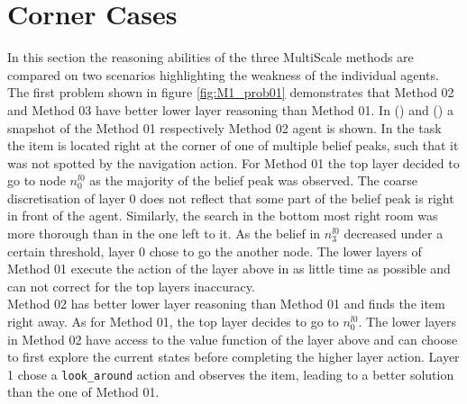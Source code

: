 
\section{Corner Cases}\label{sec:cornercases}
In this section the reasoning abilities of the three MultiScale methods are compared on two scenarios highlighting the weakness of the individual agents. The first problem shown in figure \ref{fig:M1_prob01} demonstrates that Method 02 and Method 03 have better lower layer reasoning than Method 01. In () and () a snapshot of the Method 01 respectively Method 02 agent is shown. In the task the item is located right at the corner of one of multiple belief peaks, such that it was not spotted by the navigation action. For Method 01 the top layer decided to go to node $n_0^{l0}$ as the majority of the belief peak was observed. The coarse discretisation of layer 0 does not reflect that some part of the belief peak is right in front of the agent. Similarly, the search in the bottom most right room was more thorough than in the one left to it. As the belief in $n_3^{l0}$ decreased under a certain threshold, layer 0 chose to go the another node. The lower layers of Method 01 execute the action of the layer above in as little time as possible and can not correct for the top layers inaccuracy. \\
Method 02 has better lower layer reasoning than Method 01 and finds the item right away. As for Method 01, the top layer decides to go to $n_0^{l0}$. The lower layers in Method 02 have access to the value function of the layer above and can choose to first explore the current states before completing the higher layer action. Layer 1 chose a \texttt{look\_around} action and observes the item, leading to a better solution than the one of Method 01. \\

